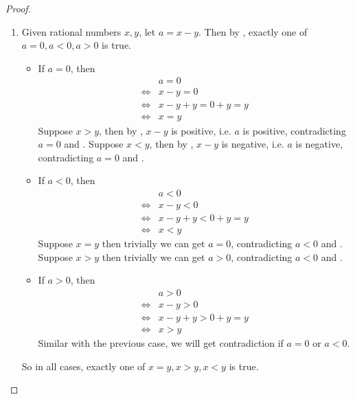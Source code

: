 \begin{proof}
\begin{enumerate}
    \item {}
        Given rational numbers \(x, y\), let \(a = x - y\).
        Then by , exactly one of \(a = 0, a < 0, a > 0\) is true.
        \begin{itemize}
            \item If \(a = 0\), then
                \begin{align*}
                         & a = 0 \\
                    \iff & x - y = 0 \\
                    \iff & x - y + y = 0 + y = y \\
                    \iff & x = y
                \end{align*}
                Suppose \(x > y\), then by , \(x - y\) is positive, i.e. \(a\) is positive, contradicting \(a = 0\) and .
                Suppose \(x < y\), then by , \(x - y\) is negative, i.e. \(a\) is negative, contradicting \(a = 0\) and .
            \item If \(a < 0\), then
                \begin{align*}
                         & a < 0 \\
                    \iff & x - y < 0 \\
                    \iff & x - y + y < 0 + y = y \\
                    \iff & x < y
                \end{align*}
                Suppose \(x = y\) then trivially we can get \(a = 0\), contradicting \(a < 0\) and .
                Suppose \(x > y\) then trivially we can get \(a > 0\), contradicting \(a < 0\) and .
            \item If \(a > 0\), then
                \begin{align*}
                         & a > 0 \\
                    \iff & x - y > 0 \\
                    \iff & x - y + y > 0 + y = y \\
                    \iff & x > y
                \end{align*}
                Similar with the previous case, we will get contradiction if \(a = 0\) or \(a < 0\).
        \end{itemize}
        So in all cases, exactly one of \(x = y, x > y, x < y\) is true.

\end{enumerate}
\end{proof}
